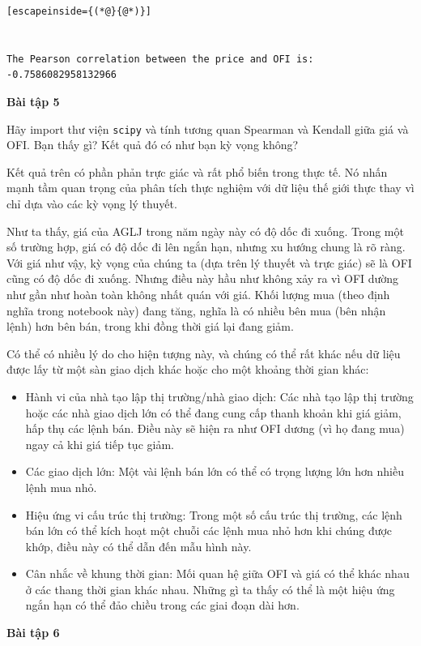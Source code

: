 \begin{lstlisting}[escapeinside={(*@}{@*)}]


The Pearson correlation between the price and OFI is:  -0.7586082958132966
\end{lstlisting}

\textbf{Bài tập 5}

Hãy import thư viện \texttt{scipy} và tính tương quan Spearman và Kendall giữa giá và OFI. Bạn thấy gì? Kết quả đó có như bạn kỳ vọng không?

Kết quả trên có phần phản trực giác và rất phổ biến trong thực tế. Nó nhấn mạnh tầm quan trọng của phân tích thực nghiệm với dữ liệu thế giới thực thay vì chỉ dựa vào các kỳ vọng lý thuyết.

Như ta thấy, giá của AGLJ trong năm ngày này có độ dốc đi xuống. Trong một số trường hợp, giá có độ dốc đi lên ngắn hạn, nhưng xu hướng chung là rõ ràng. Với giá như vậy, kỳ vọng của chúng ta (dựa trên lý thuyết và trực giác) sẽ là OFI cũng có độ dốc đi xuống. Nhưng điều này hầu như không xảy ra vì OFI dường như gần như hoàn toàn không nhất quán với giá. Khối lượng mua (theo định nghĩa trong notebook này) đang tăng, nghĩa là có nhiều bên mua (bên nhận lệnh) hơn bên bán, trong khi đồng thời giá lại đang giảm.

Có thể có nhiều lý do cho hiện tượng này, và chúng có thể rất khác nếu dữ liệu được lấy từ một sàn giao dịch khác hoặc cho một khoảng thời gian khác:

\begin{itemize}
  \item Hành vi của nhà tạo lập thị trường/nhà giao dịch: Các nhà tạo lập thị trường hoặc các nhà giao dịch lớn có thể đang cung cấp thanh khoản khi giá giảm, hấp thụ các lệnh bán. Điều này sẽ hiện ra như OFI dương (vì họ đang mua) ngay cả khi giá tiếp tục giảm.
  \item Các giao dịch lớn: Một vài lệnh bán lớn có thể có trọng lượng lớn hơn nhiều lệnh mua nhỏ.
  \item Hiệu ứng vi cấu trúc thị trường: Trong một số cấu trúc thị trường, các lệnh bán lớn có thể kích hoạt một chuỗi các lệnh mua nhỏ hơn khi chúng được khớp, điều này có thể dẫn đến mẫu hình này.
  \item Cân nhắc về khung thời gian: Mối quan hệ giữa OFI và giá có thể khác nhau ở các thang thời gian khác nhau. Những gì ta thấy có thể là một hiệu ứng ngắn hạn có thể đảo chiều trong các giai đoạn dài hơn.
\end{itemize}

\textbf{Bài tập 6}

